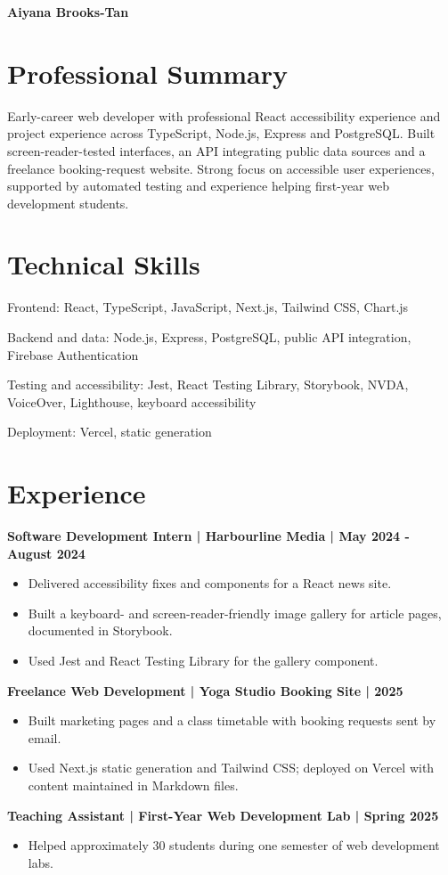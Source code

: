\documentclass[11pt,a4paper]{article}
\newcommand{\cvsection}[1]{\section*{#1}}
\newcommand{\cvitem}[1]{\par\noindent\textbf{#1}\par}
\begin{document}
{\Huge\bfseries\color{primarycolor} Aiyana Brooks-Tan}\par

\cvsection{Professional Summary}
Early-career web developer with professional React accessibility experience and project experience across TypeScript, Node.js, Express and PostgreSQL. Built screen-reader-tested interfaces, an API integrating public data sources and a freelance booking-request website. Strong focus on accessible user experiences, supported by automated testing and experience helping first-year web development students.

\cvsection{Technical Skills}
Frontend: React, TypeScript, JavaScript, Next.js, Tailwind CSS, Chart.js\par
Backend and data: Node.js, Express, PostgreSQL, public API integration, Firebase Authentication\par
Testing and accessibility: Jest, React Testing Library, Storybook, NVDA, VoiceOver, Lighthouse, keyboard accessibility\par
Deployment: Vercel, static generation

\cvsection{Experience}
\cvitem{Software Development Intern | Harbourline Media | May 2024 - August 2024}
\begin{itemize}
\item Delivered accessibility fixes and components for a React news site.
\item Built a keyboard- and screen-reader-friendly image gallery for article pages, documented in Storybook.
\item Used Jest and React Testing Library for the gallery component.
\end{itemize}
\cvitem{Freelance Web Development | Yoga Studio Booking Site | 2025}
\begin{itemize}
\item Built marketing pages and a class timetable with booking requests sent by email.
\item Used Next.js static generation and Tailwind CSS; deployed on Vercel with content maintained in Markdown files.
\end{itemize}
\cvitem{Teaching Assistant | First-Year Web Development Lab | Spring 2025}
\begin{itemize}
\item Helped approximately 30 students during one semester of web development labs.
\end{itemize}
\end{document}
